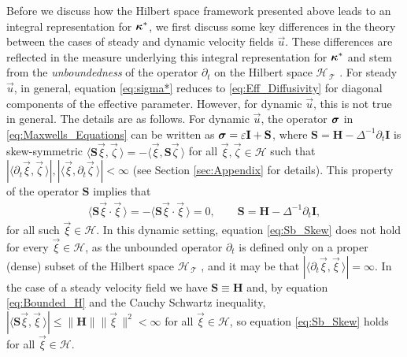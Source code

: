 \documentclass[11pt]{amsart}
\newcommand{\Hb}{\mathbf{H}}
\newcommand{\Ib}{\mathbf{I}}
\newcommand{\Sb}{\mathbf{S}}
\newcommand{\Tc}{\mathcal{T}}
\newcommand{\Hs}{\mathscr{H}}
\newcommand\bsig{\mbox{\boldmath${\sigma}$}}
\newcommand\bkappa{\mbox{\boldmath${\kappa}$}}
\begin{document}
Before we discuss how the Hilbert space framework presented above
leads to an  integral representation for $\bkappa^*$, we first
discuss some key differences in the theory between the cases of steady
and dynamic velocity fields $\vec{u}$. These differences are reflected
in the measure underlying this integral representation for $\bkappa^*$
and stem from the \emph{unboundedness} of the operator $\partial_t$ on the
Hilbert space $\Hs_{\,\Tc}$ \cite{Reed-1980,Stone:64}. For steady
$\vec{u}$, in general, equation \eqref{eq:sigma*} reduces to
\eqref{eq:Eff_Diffusivity} for  diagonal components of the effective
parameter.  However, for dynamic $\vec{u}$, this is not true in
general. The details are as follows. For dynamic $\vec{u}$, the
operator $\bsig$ in \eqref{eq:Maxwells_Equations} can be written as
$\bsig=\varepsilon\Ib+\Sb$, where  $\Sb=\Hb-\Delta^{-1}\partial_t\Ib$ is skew-symmetric 
$\langle\Sb\vec{\xi},\vec{\zeta}\,\rangle=-\langle\vec{\xi},\Sb\vec{\zeta}\,\rangle$ for all
$\vec{\xi},\vec{\zeta}\in\Hs$ such that
$|\langle\partial_t\vec{\xi},\vec{\zeta}\,\rangle|,|\langle\vec{\xi},\partial_t\vec{\zeta}\,\rangle|<\infty$ (see Section
\ref{sec:Appendix} for details).  
This property of the operator $\Sb$ implies that
%
\begin{align}\label{eq:Sb_Skew}
  \langle\Sb\vec{\xi}\cdot\vec{\xi}\,\rangle=-\langle\Sb\vec{\xi}\cdot\vec{\xi}\,\rangle=0,
  \qquad
  \Sb=\Hb-\Delta^{-1}\partial_t\Ib,
\end{align}
%
for all such $\vec{\xi}\in\Hs$. In this dynamic setting, equation
\eqref{eq:Sb_Skew} does not hold for every $\vec{\xi}\in\Hs$, as the
unbounded operator $\partial_t$ is defined only on a proper (dense) subset of
the Hilbert space $\Hs_{\,\Tc}$ \cite{Reed-1980}, and it may be that
$|\langle\partial_t\vec{\xi},\vec{\xi}\,\rangle|=\infty$. In the case of a steady velocity field
we have $\Sb\equiv\Hb$ and, by equation \eqref{eq:Bounded_H} and the Cauchy
Schwartz inequality, $|\langle\Sb\vec{\xi},\vec{\xi}\,\rangle|\leq\|\Hb\|\|\vec{\xi}\,\|^2<\infty$ for
all $\vec{\xi}\in\Hs$, so equation \eqref{eq:Sb_Skew} holds for all
$\vec{\xi}\in\Hs$.   
\end{document}
